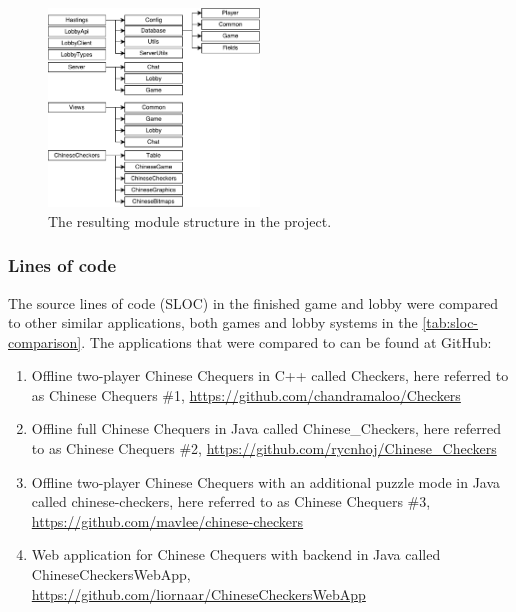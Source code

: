 \documentclass[a4paper]{article}
\begin{document}
\begin{figure}[ht]
    \centering
    \includegraphics[scale=0.3,width=0.5\textwidth]{figure/module-dependencies}
    \caption{The resulting module structure in the project.}
    \label{fig:module-dependencies}
\end{figure}


\subsubsection{Lines of code}
\label{subsub:lines-of-code-results}
The source lines of code (SLOC) in the finished game and lobby were compared to other similar applications, both games and lobby systems in the \cref{tab:sloc-comparison}. The applications that were compared to can be found at GitHub:
\begin{enumerate}
    \item Offline two-player Chinese Chequers in C++ called Checkers, here referred to as Chinese Chequers \#1, \url{https://github.com/chandramaloo/Checkers}
    \item Offline full Chinese Chequers in Java called Chinese\_Checkers, here referred to as Chinese Chequers \#2, \url{https://github.com/rycnhoj/Chinese_Checkers}
    \item Offline two-player Chinese Chequers with an additional puzzle mode in Java called chinese-checkers, here referred to as Chinese Chequers \#3, \url{https://github.com/mavlee/chinese-checkers}
    \item Web application for Chinese Chequers with backend in Java called ChineseCheckersWebApp, \url{https://github.com/liornaar/ChineseCheckersWebApp}
\end{enumerate}
\end{document}
